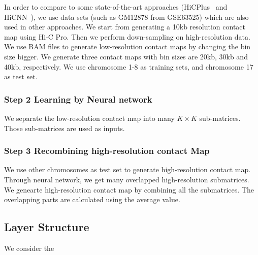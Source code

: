 \documentclass{article}
\begin{document}
In order to compare to some state-of-the-art approaches (HiCPlus~\cite{Zhang2018} and HiCNN~\cite{Liu2019}), 
we use data sets (such as GM12878 from GSE63525) which are also used in other approaches. 
We start from generating a 10kb resolution contact map 
using Hi-C Pro. 
Then we perform down-sampling on high-resolution data. 
We use BAM files to generate low-resolution contact maps by changing the bin size bigger. 
We generate three contact maps with bin sizes are 20kb, 30kb and 40kb, respectively. 
We use chromosome 1-8 as training sets, and chromosome 17 as test set.

\subsubsection*{Step 2 Learning by Neural network}
We separate the low-resolution contact map into many $K \times K$ sub-matrices. 
Those sub-matrices are used as inputs.


\subsubsection*{Step 3 Recombining high-resolution contact Map}
We use other chromosomes as test set to generate high-resolution contact map. Through neural network, we get many overlapped high-resolution submatrices. We genearte high-resolution contact map by combining all the submatrices. The overlapping parts are calculated using the average value.

\subsection{Layer Structure}
We consider the 





 
\end{document}
